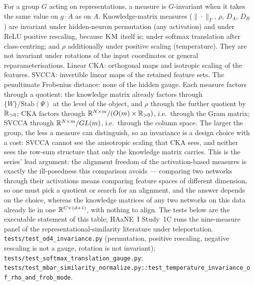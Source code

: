 {For a group $G$ acting on representations, a measure is $G$-invariant when it takes the same value on $g\cdot A$ as on $A$. Knowledge-matrix measures ($\|\cdot\|_F$, $\rho$, $D_A$, $D_B$) are invariant under hidden-neuron permutation (any activation) and under ReLU positive rescaling, because $\textsc{KM}$ itself is; under softmax translation after class-centring; and $\rho$ additionally under positive scaling (temperature). They are not invariant under rotations of the input coordinates or general reparameterisations. Linear CKA: orthogonal maps and isotropic scaling of the features. SVCCA: invertible linear maps of the retained feature sets. The penultimate Frobenius distance: none of the hidden gauge.}
{Each measure factors through a quotient: the knowledge matrix already factors through $\{W\}/\mathrm{Stab}(\Psi)$ at the level of the object, and $\rho$ through the further quotient by $\mathbb{R}_{>0}$; CKA factors through $\mathbb{R}^{N\times m}/(O(m)\times\mathbb{R}_{>0})$, i.e.\ through the Gram matrix; SVCCA through $\mathbb{R}^{N\times m}/GL(m)$, i.e.\ through the column space. The larger the group, the less a measure can distinguish, so an invariance is a design choice with a cost: SVCCA cannot see the anisotropic scaling that CKA sees, and neither sees the row-sum structure that only the knowledge matrix carries. This is the series' lead argument: the alignment freedom of the activation-based measures is exactly the ill-posedness this comparison avoids --- comparing two networks through their activations means comparing feature spaces of different dimension, so one must pick a quotient or search for an alignment, and the answer depends on the choice, whereas the knowledge matrices of any two networks on this data already lie in one $\mathbb{R}^{C\times(d+1)}$, with nothing to align.}
{The tests below are the executable statement of this table; HAaNE~I Study~1C runs the nine-measure panel of the representational-similarity literature under teleportation.}
{\texttt{tests/test\_od4\_invariance.py} (permutation, positive rescaling, negative rescaling is not a gauge, rotation is not invariant); \texttt{tests/test\_softmax\_translation\_gauge.py}; \texttt{tests/test\_mbar\_similarity\_normalize.py::test\_temperature\_invariance\_of\_rho\_and\_frob\_mode}.}
